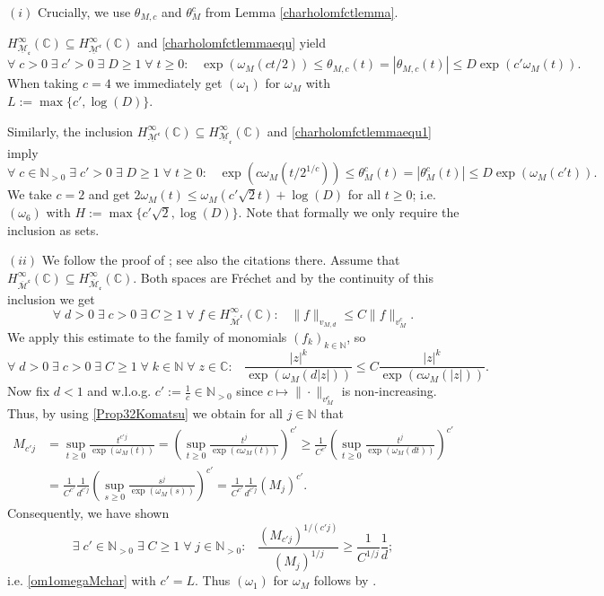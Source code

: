 \documentclass[10pt]{amsart}%
\numberwithin{equation}{section}
\theoremstyle{plain}
\newcommand{\CC}{\mathbb{C}}
\newcommand{\NN}{\mathbb{N}}
\begin{document}
$(i)$ Crucially, we use $\theta_{M,c}$ and $\theta_M^c$ from Lemma \ref{charholomfctlemma}.

$H^{\infty}_{\underline{\mathcal{M}}_{\mathfrak{c}}}(\CC)\subseteq H^{\infty}_{\underline{\mathcal{M}}^{\mathfrak{c}}}(\CC)$ and \eqref{charholomfctlemmaequ} yield
$$\forall\;c>0\;\exists\;c'>0\;\exists\;D\ge 1\;\forall\;t\ge 0:\;\;\;\exp(\omega_M(ct/2))\le\theta_{M,c}(t)=|\theta_{M,c}(t)|\le D\exp(c'\omega_M(t)).$$
When taking $c=4$ we immediately get \hyperlink{om1}{$(\omega_1)$} for $\omega_M$ with $L:=\max\{c',\log(D)\}$.

Similarly, the inclusion $H^{\infty}_{\underline{\mathcal{M}}^{\mathfrak{c}}}(\CC)\subseteq H^{\infty}_{\underline{\mathcal{M}}_{\mathfrak{c}}}(\CC)$ and \eqref{charholomfctlemmaequ1} imply
$$\forall\;c\in\NN_{>0}\;\exists\;c'>0\;\exists\;D\ge 1\;\forall\;t\ge 0:\;\;\;\exp(c\omega_M(t/2^{1/c}))\le\theta^c_M(t)=|\theta^c_M(t)|\le D\exp(\omega_M(c't)).$$
We take $c=2$ and get $2\omega_M(t)\le\omega_M(c'\sqrt{2}t)+\log(D)$ for all $t\ge 0$; i.e. \hyperlink{om6}{$(\omega_6)$} with $H:=\max\{c'\sqrt{2},\log(D)\}$. Note that formally we only require the inclusion as sets.\vspace{6pt}

$(ii)$ We follow the proof of \cite[Prop. 3.14]{weightedentirecharacterization}; see also the citations there. Assume that $H^{\infty}_{\overline{\mathcal{M}}^{\mathfrak{c}}}(\CC)\subseteq H^{\infty}_{\overline{\mathcal{M}}_{\mathfrak{c}}}(\CC)$. Both spaces are Fr\'{e}chet and by the continuity of this inclusion we get
$$\forall\;d>0\;\exists\;c>0\;\exists\;C\ge 1\;\forall\;f\in H^{\infty}_{\overline{\mathcal{M}}^{\mathfrak{c}}}(\CC):\;\;\; \|f\|_{v_{M,d}}\le C\|f\|_{v^c_M}.$$
We apply this estimate to the family of monomials $(f_k)_{k\in\NN}$, so
$$\forall\;d>0\;\exists\;c>0\;\exists\;C\ge 1\;\forall\;k\in\NN\;\forall\;z\in\CC:\;\;\;\frac{|z|^k}{\exp(\omega_M(d|z|))}\le C\frac{|z|^k}{\exp(c\omega_M(|z|))}.$$
Now fix $d<1$ and w.l.o.g. $c':=\frac{1}{c}\in\NN_{>0}$ since $c\mapsto\|\cdot\|_{v^c_M}$ is non-increasing. Thus, by using \eqref{Prop32Komatsu} we obtain for all $j\in\NN$ that
\begin{align*}
M_{c'j}&=\sup_{t\ge 0}\frac{t^{c'j}}{\exp(\omega_{M}(t))}=\left(\sup_{t\ge 0}\frac{t^{j}}{\exp(c\omega_{M}(t))}\right)^{c'}\ge\frac{1}{C^{c'}}\left(\sup_{t\ge 0}\frac{t^{j}}{\exp(\omega_{M}(dt))}\right)^{c'}
\\&
=\frac{1}{C^{c'}}\frac{1}{d^{c'j}}\left(\sup_{s\ge 0}\frac{s^{j}}{\exp(\omega_{M}(s))}\right)^{c'}=\frac{1}{C^{c'}}\frac{1}{d^{c'j}}(M_j)^{c'}.
\end{align*}
Consequently, we have shown
\begin{equation}\label{om1omegaMchar1}
\exists\;c'\in\NN_{>0}\;\exists\;C\ge 1\;\forall\;j\in\NN_{>0}:\;\;\;\frac{(M_{c'j})^{1/(c'j)}}{(M_j)^{1/j}}\ge\frac{1}{C^{1/j}}\frac{1}{d};
\end{equation}
i.e. \eqref{om1omegaMchar} with $c'=L$. Thus \hyperlink{om1}{$(\omega_1)$} for $\omega_M$ follows by \cite[Thm. 3.1]{subaddlike}.\vspace{6pt}
\end{document}
